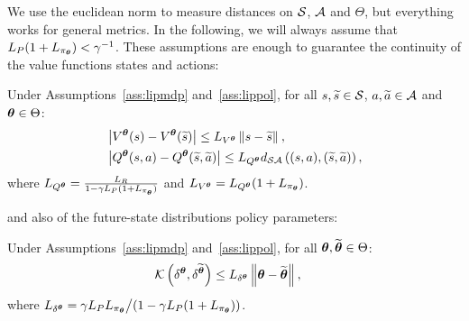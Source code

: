 %
We use the euclidean norm to measure distances on $\mathcal{S}$, $\mathcal{A}$ and $\Theta$, but everything works for general metrics.
In the following, we will always assume that ${L_{P}(1+L_{\pi_{\boldsymbol{\theta}}}) < \gamma^{-1}}$.
These assumptions are enough to guarantee the continuity of the value functions \wrt states and actions:
%
\begin{lemma}\label{lem:lipval}
	Under Assumptions~\ref{ass:lipmdp} and~\ref{ass:lippol}, for all $s,\widetilde{s}\in\mathcal{S}$, $a,\widetilde{a}\in\mathcal{A}$ and $\boldsymbol{\theta}\in\Theta$:
	\begin{align}
	&\left|V^{\boldsymbol{\theta}}(s) - V^{\boldsymbol{\theta}}(\widetilde{s})\right| \leq L_{V^{\boldsymbol{\theta}}}\left\|s-\widetilde{s}\right\|_{}, \\
	&\left|Q^{\boldsymbol{\theta}}(s,a) - Q^{\boldsymbol{\theta}}(\widetilde{s},\widetilde{a})\right| \leq L_{Q^{\boldsymbol{\theta}}}d_{\mathcal{S}\mathcal{A}}\left((s,a),(\widetilde{s},\widetilde{a})\right),
	\end{align}
	where $L_{Q^{\boldsymbol{\theta}}} = \frac{L_{R}}{1-\gamma L_{P}(1+L_{\pi_{\boldsymbol{\theta}}})}$ and $L_{V^{\boldsymbol{\theta}}} = L_{Q^{\boldsymbol{\theta}}}(1+L_{\pi_{\boldsymbol{\theta}}})$.
\end{lemma}
%
and also of the future-state distributions \wrt policy parameters:
%
\begin{lemma}\label{lem:lipfut}
	Under Assumptions~\ref{ass:lipmdp} and~\ref{ass:lippol}, for all $\boldsymbol{\theta},\widetilde{\boldsymbol{\theta}}\in\Theta$:
	\begin{align}
	&\mathcal{K}\left(\delta^{\boldsymbol{\theta}},\delta^{\widetilde{\boldsymbol{\theta}}}\right) \leq L_{\delta^{\boldsymbol{\theta}}}\left\|\boldsymbol{\theta}-\widetilde{\boldsymbol{\theta}}\right\|_{},
	\end{align}
	where $L_{\delta^{\boldsymbol{\theta}}} = {\gamma L_{P}L_{\pi_{\boldsymbol{\theta}}}}\big/{\left(1-\gamma L_{P}(1+L_{\pi_{\boldsymbol{\theta}}})\right)}$.
\end{lemma}

